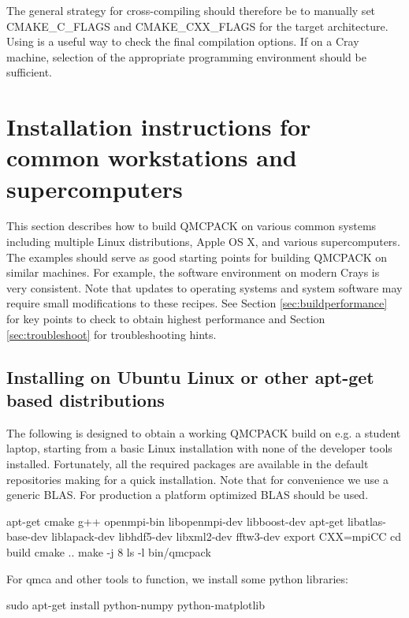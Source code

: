 The general strategy for cross-compiling should therefore be to
manually set CMAKE\_C\_FLAGS and CMAKE\_CXX\_FLAGS for the target
architecture. Using  is a useful way to check the
final compilation options.  If on a Cray machine, selection of the
appropriate programming environment should be sufficient.

\section{Installation instructions for common workstations and
  supercomputers}
\label{sec:installexamples}

This section describes how to build QMCPACK on various common systems
including multiple Linux distributions, Apple OS X, and various
supercomputers. The examples should serve as good starting points for
building QMCPACK on similar machines. For example, the software
environment on modern Crays is very consistent. Note that updates to
operating systems and system software may require small modifications
to these recipes. See Section \ref{sec:buildperformance} for key
points to check to obtain highest performance and
Section \ref{sec:troubleshoot} for troubleshooting hints.

\subsection{Installing on Ubuntu Linux or other apt-get based distributions}
\label{sec:buildubuntu}

The following is designed to obtain a working QMCPACK build on e.g. a
student laptop, starting from a basic Linux installation with none of
the developer tools installed. Fortunately, all the required packages
are available in the default repositories making for a quick
installation. Note that for convenience we use a generic BLAS. For
production a platform optimized BLAS should be used.


\begin{shade}
apt-get cmake g++ openmpi-bin libopenmpi-dev libboost-dev
apt-get libatlas-base-dev liblapack-dev libhdf5-dev libxml2-dev fftw3-dev
export CXX=mpiCC
cd build
cmake ..
make -j 8
ls -l bin/qmcpack
\end{shade}

For qmca and other tools to function, we install some python libraries:

\begin{shade}
sudo apt-get install python-numpy python-matplotlib
\end{shade}

